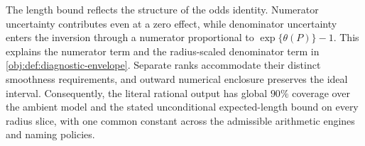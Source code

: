 The length bound reflects the structure of the odds identity. Numerator uncertainty contributes even at a zero effect, while denominator uncertainty enters the inversion through a numerator proportional to \(\exp\{\theta(P)\}-1\). This explains the numerator term and the radius-scaled denominator term in \cref{obj:def:diagnostic-envelope}. Separate ranks accommodate their distinct smoothness requirements, and outward numerical enclosure preserves the ideal interval. Consequently, the literal rational output has global \(90\%\) coverage over the ambient model and the stated unconditional expected-length bound on every radius slice, with one common constant across the admissible arithmetic engines and naming policies.
